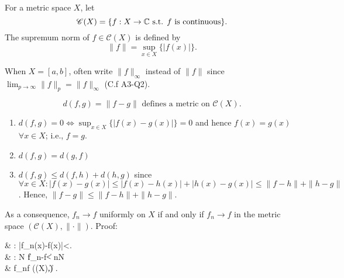 \begin{example}
\begin{enumerate}
\begin{center}
		      \end{center}
	\end{enumerate}
\end{example}
\begin{define}[14]
	For a metric space $X$,
	let \[
		\mathscr{C}(X)=\{f: X \to \mathbb{C} \text{ s.t. } f \text{ is continuous}\}
		.\]
	The supremum norm of $f \in \mathscr{C}(X)$ is defined by \[
		\|f\|=\sup_{x \in X}\{\left|f(x)\right|\}
		.\]
	\begin{notation}
		When $X=[a,b]$, often write $\|f\|_{\infty}$ instead of $\|f\|$ since $\lim_{p\to \infty}{\|f\|_p}= \|f\|_{\infty}$ (C.f A3-Q2).
	\end{notation}
\end{define}

\begin{prop}
	\[
		d(f,g)= \|f-g\| \text{ defines a metric on } \mathscr{C}(X)
		.\]
	\begin{enumerate}
		\item {$d(f,g)=0 \iff \sup_{x \in X}\{\left|f(x)-g(x)\right| \}=0$ and hence $f(x)=g(x)$  $\forall x \in X$; i.e., $f=g$.}
		\item {$d(f,g)=d(g,f)$}
		\item {$d(f,g)\le d(f,h)+d(h,g)$ since $\forall{x \in X}: \left|f(x)-g(x)\right|\le \left|f(x)-h(x)\right|+ \left|h(x)-g(x)\right|\le \|f-h\|+ \|h-g\|$. Hence, $\|f-g\|\le \|f-h\|+\|h-g\|$.}
	\end{enumerate}
	As a consequence, $f_{n}\to f$ uniformly on $X$ if and only if $f_{n}\to f$ in the metric space $(\mathscr{C}(X),\|\cdot\|)$.
	Proof:	\begin{flalign*}
		 & \Leftrightarrow  {}:   \left|f_{n}(x)-f(x)\right|<\epsilon  {}. \\
		           & \Leftrightarrow {}: \exists N   \|f_{n}-f\|<\epsilon {} n\ge N                                      \\
		           & \Leftrightarrow f_{n}\to f  ((X),\|\cdot\|)
		.\end{flalign*}
\end{prop}


